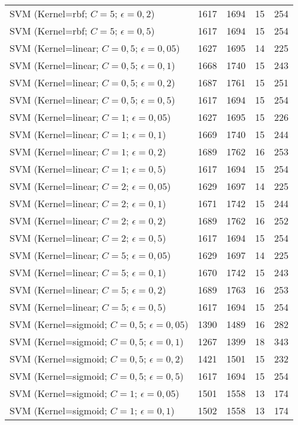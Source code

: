 \begin{center}
\begin{longtable}{|l|l|l|l|l|}
SVM (Kernel=rbf; $C=5$; $\epsilon=0,2$) & 1617 & 1694 & 15 & 254 \\
SVM (Kernel=rbf; $C=5$; $\epsilon=0,5$) & 1617 & 1694 & 15 & 254 \\
SVM (Kernel=linear; $C=0,5$; $\epsilon=0,05$) & 1627 & 1695 & 14 & 225 \\
SVM (Kernel=linear; $C=0,5$; $\epsilon=0,1$) & 1668 & 1740 & 15 & 243 \\
SVM (Kernel=linear; $C=0,5$; $\epsilon=0,2$) & 1687 & 1761 & 15 & 251 \\
SVM (Kernel=linear; $C=0,5$; $\epsilon=0,5$) & 1617 & 1694 & 15 & 254 \\
SVM (Kernel=linear; $C=1$; $\epsilon=0,05$) & 1627 & 1695 & 15 & 226 \\
SVM (Kernel=linear; $C=1$; $\epsilon=0,1$) & 1669 & 1740 & 15 & 244 \\
SVM (Kernel=linear; $C=1$; $\epsilon=0,2$) & 1689 & 1762 & 16 & 253 \\
SVM (Kernel=linear; $C=1$; $\epsilon=0,5$) & 1617 & 1694 & 15 & 254 \\
SVM (Kernel=linear; $C=2$; $\epsilon=0,05$) & 1629 & 1697 & 14 & 225 \\
SVM (Kernel=linear; $C=2$; $\epsilon=0,1$) & 1671 & 1742 & 15 & 244 \\
SVM (Kernel=linear; $C=2$; $\epsilon=0,2$) & 1689 & 1762 & 16 & 252 \\
SVM (Kernel=linear; $C=2$; $\epsilon=0,5$) & 1617 & 1694 & 15 & 254 \\
SVM (Kernel=linear; $C=5$; $\epsilon=0,05$) & 1629 & 1697 & 14 & 225 \\
SVM (Kernel=linear; $C=5$; $\epsilon=0,1$) & 1670 & 1742 & 15 & 243 \\
SVM (Kernel=linear; $C=5$; $\epsilon=0,2$) & 1689 & 1763 & 16 & 253 \\
SVM (Kernel=linear; $C=5$; $\epsilon=0,5$) & 1617 & 1694 & 15 & 254 \\
SVM (Kernel=sigmoid; $C=0,5$; $\epsilon=0,05$) & 1390 & 1489 & 16 & 282 \\
SVM (Kernel=sigmoid; $C=0,5$; $\epsilon=0,1$) & 1267 & 1399 & 18 & 343 \\
SVM (Kernel=sigmoid; $C=0,5$; $\epsilon=0,2$) & 1421 & 1501 & 15 & 232 \\
SVM (Kernel=sigmoid; $C=0,5$; $\epsilon=0,5$) & 1617 & 1694 & 15 & 254 \\
SVM (Kernel=sigmoid; $C=1$; $\epsilon=0,05$) & 1501 & 1558 & 13 & 174 \\
SVM (Kernel=sigmoid; $C=1$; $\epsilon=0,1$) & 1502 & 1558 & 13 & 174 \\

\end{longtable}
\end{center}
